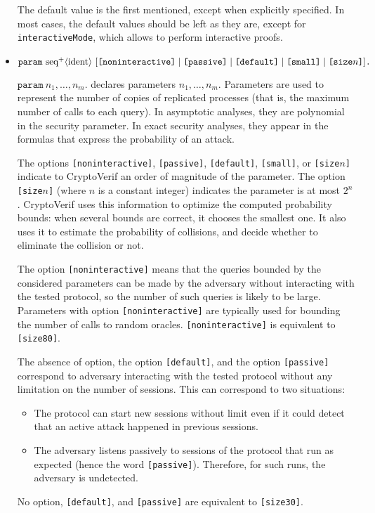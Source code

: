 \begin{itemize}
\begin{itemize}
\end{itemize}
The default value is the first mentioned, except when explicitly specified.
In most cases, the default values should be left as they are, except
for {\tt interactiveMode}, which allows to perform 
interactive proofs.

\item $\texttt{param}\ \neseq{ident}\ [\texttt{[noninteractive]}\mid \texttt{[passive]} \mid \texttt{[default]} \mid \texttt{[small]} \mid \texttt{[size$n$]}]\texttt{.}$

$\texttt{param}\ n_1, \ldots, n_m\texttt{.}$ declares parameters $n_1, \ldots, n_m$.
Parameters are used to represent the number of copies of replicated processes
(that is, the maximum number of calls to each query).
In asymptotic analyses, they are polynomial in the security parameter.
In exact security analyses, they appear in the formulas that express the
probability of an attack.

The options \texttt{[noninteractive]}, \texttt{[passive]}, \texttt{[default]}, \texttt{[small]}, or \texttt{[size$n$]}
indicate to CryptoVerif an order of magnitude of the parameter.
%
The option \texttt{[size$n$]} (where $n$ is a constant integer) indicates
the parameter is at most $2^n$.
CryptoVerif uses this
information to optimize the computed probability bounds: when several
bounds are correct, it chooses the smallest one.
It also uses it to estimate the probability of collisions,
and decide whether to eliminate the collision or not.

The option \texttt{[noninteractive]} means that
the queries bounded by the considered parameters can be made by the
adversary without interacting with the tested protocol, so the number
of such queries is likely to be large.
Parameters with option \texttt{[noninteractive]} are typically 
used for bounding the number of calls to random oracles.
\texttt{[noninteractive]} is equivalent to \texttt{[size80]}.

The absence of option, the option \texttt{[default]}, and the option \texttt{[passive]} correspond
to adversary interacting with the tested protocol without any limitation
on the number of sessions. This can correspond to two situations:
\begin{itemize}
\item The protocol can start new sessions without limit even 
  if it could detect that an active attack happened in previous sessions.
\item The adversary listens passively to sessions of the protocol that
  run as expected (hence the word \texttt{[passive]}). Therefore, for
  such runs, the adversary is undetected.
\end{itemize}
No option, \texttt{[default]}, and \texttt{[passive]} are equivalent to \texttt{[size30]}.


\end{itemize}
